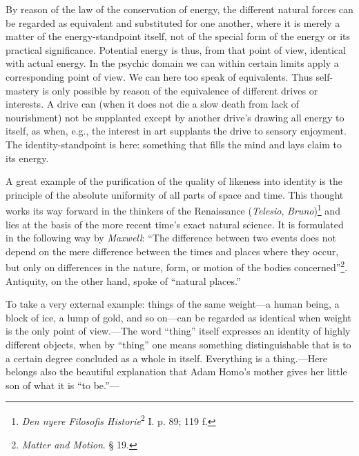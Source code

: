 \documentclass[12pt,a4paper]{book}
\newcommand{\opage}[1]{\marginnote{\footnotesize\textit{[#1]}}}
\begin{document}
By reason of the law of the conservation of energy, the different natural
forces can be regarded as equivalent and substituted for one another, where
it is merely a matter of the energy-standpoint itself, not of the special
form of the energy or its practical significance. Potential energy is thus,
from that point of view, identical with actual energy. In the psychic domain
we can within certain limits apply a corresponding point of view. We can here
too speak of equivalents. Thus self-mastery is only possible by reason of
the equivalence of different drives or interests. A drive can (when it does
not die a slow death from lack of nourishment) not be supplanted except by
another drive's drawing all energy to itself, as when, e.g., the interest in art
supplants the drive to sensory enjoyment. The identity-standpoint is here:
something that fills the mind and lays claim to its energy.

A great example of the purification of the quality of likeness into identity
is the principle of the absolute uniformity of all parts of space and time.
This thought works its way forward in the thinkers of the Renaissance
(\emph{Telesio}, \emph{Bruno})\footnote{\emph{Den nyere Filosofis
Historie}\textsuperscript{2} I. p. 89; 119 f.} and lies at the basis of the
more recent time's exact natural science. It is formulated in the following
way by \emph{Maxwell}: ``The difference between two events does not depend on the mere difference between the times and places where they occur,
but only on differences in the \opage{180}nature, form, or motion of the bodies
concerned''\footnote{\emph{Matter and Motion}. § 19.}. Antiquity, on the
other hand, spoke of ``natural places.''

To take a very external example: things of the same weight---a human being,
a block of ice, a lump of gold, and so on---can be regarded as identical
when weight is the only point of view.---The word ``thing'' itself expresses
an identity of highly different objects, when by ``thing'' one means
something distinguishable that is to a certain degree concluded as a whole in
itself. Everything is a thing.---Here belongs also the beautiful explanation
that Adam Homo's mother gives her little son of what it is ``to be.''---
\end{document}
